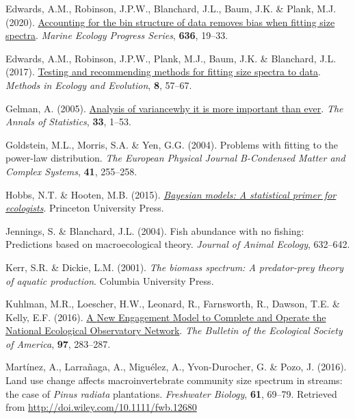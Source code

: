 \documentclass[
  12pt,
]{article}
\newlength{\cslhangindent}
\newlength{\cslentryspacingunit} %
\newenvironment{CSLReferences}[2] %
 {%
  \setlength{\parindent}{0pt}
  \ifodd #1
  \let\oldpar\par
  \def\par{\hangindent=\cslhangindent\oldpar}
  \fi
  \setlength{\parskip}{#2\cslentryspacingunit}
 }%
 {}
\begin{document}
\begin{CSLReferences}{1}{0}
\leavevmode{}%
Edwards, A.M., Robinson, J.P.W., Blanchard, J.L., Baum, J.K. \& Plank,
M.J. (2020). \href{https://doi.org/10.3354/meps13230}{Accounting for the
bin structure of data removes bias when fitting size spectra}.
\emph{Marine Ecology Progress Series}, \textbf{636}, 19--33.

\leavevmode{}%
Edwards, A.M., Robinson, J.P.W., Plank, M.J., Baum, J.K. \& Blanchard,
J.L. (2017). \href{https://doi.org/10.1111/2041-210X.12641}{Testing and
recommending methods for fitting size spectra to data}. \emph{Methods in
Ecology and Evolution}, \textbf{8}, 57--67.

\leavevmode{}%
Gelman, A. (2005).
\href{https://doi.org/10.1214/009053604000001048}{Analysis of
variance\textemdash why it is more important than ever}. \emph{The
Annals of Statistics}, \textbf{33}, 1--53.

\leavevmode{}%
Goldstein, M.L., Morris, S.A. \& Yen, G.G. (2004). Problems with fitting
to the power-law distribution. \emph{The European Physical Journal
B-Condensed Matter and Complex Systems}, \textbf{41}, 255--258.

\leavevmode{}%
Hobbs, N.T. \& Hooten, M.B. (2015).
\emph{\href{https://doi.org/10.23943/princeton/9780691159287.001.0001}{Bayesian
models: {A} statistical primer for ecologists}}. {Princeton University
Press}.

\leavevmode{}%
Jennings, S. \& Blanchard, J.L. (2004). Fish abundance with no fishing:
Predictions based on macroecological theory. \emph{Journal of Animal
Ecology}, 632--642.

\leavevmode{}%
Kerr, S.R. \& Dickie, L.M. (2001). \emph{The biomass spectrum: {A}
predator-prey theory of aquatic production}. {Columbia University
Press}.

\leavevmode{}%
Kuhlman, M.R., Loescher, H.W., Leonard, R., Farnsworth, R., Dawson, T.E.
\& Kelly, E.F. (2016). \href{https://doi.org/10.1002/bes2.1248}{A {New
Engagement Model} to {Complete} and {Operate} the {National Ecological
Observatory Network}}. \emph{The Bulletin of the Ecological Society of
America}, \textbf{97}, 283--287.

\leavevmode{}%
Martínez, A., Larrañaga, A., Miguélez, A., Yvon-Durocher, G. \& Pozo, J.
(2016). Land use change affects macroinvertebrate community size
spectrum in streams: the case of {\emph{Pinus radiata}} plantations.
\emph{Freshwater Biology}, \textbf{61}, 69--79. Retrieved from
\url{http://doi.wiley.com/10.1111/fwb.12680}


\end{CSLReferences}
\end{document}
